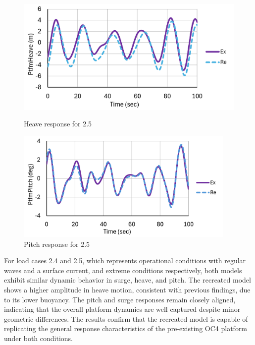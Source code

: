 \documentclass[a4paper, 11pt]{article}
\begin{document}
\begin{figure}[H]
    \begin{minipage}{0.48\textwidth}
        \centering
        \includegraphics[width=1\textwidth]{2.5_heave_mine.png}
        \caption{\small Heave response for 2.5}
        \label{fig:2.5_heave_mine_recreated}
    \end{minipage}
    \hfill
    \begin{minipage}{0.5\textwidth}
        \centering
        \includegraphics[width=0.95\textwidth]{2.5_pitch_mine.png}
        \caption{\small Pitch response for 2.5}
        \label{fig:2.5_pitch_mine_recreated}
    \end{minipage}
\end{figure}

For load cases 2.4 and 2.5, which represents operational conditions with regular waves and a surface current, and extreme conditions respectively, both models exhibit similar dynamic behavior in surge, heave, and pitch. The recreated model shows a higher amplitude in heave motion, consistent with previous findings, due to its lower buoyancy. The pitch and surge responses remain closely aligned, indicating that the overall platform dynamics are well captured despite minor geometric differences. The results confirm that the recreated model is capable of replicating the general response characteristics of the pre-existing OC4 platform under both conditions.
\end{document}
